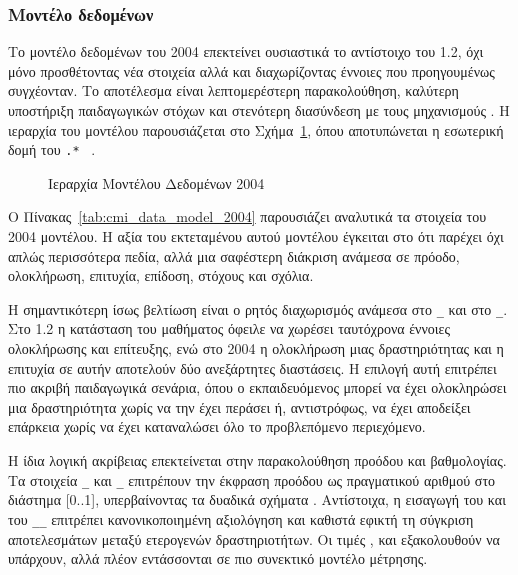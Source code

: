 \subsubsection{Μοντέλο δεδομένων}

Το μοντέλο δεδομένων του  2004 επεκτείνει ουσιαστικά το αντίστοιχο του  1.2, όχι μόνο προσθέτοντας νέα στοιχεία αλλά και διαχωρίζοντας έννοιες που προηγουμένως συγχέονταν. Το αποτέλεσμα είναι λεπτομερέστερη παρακολούθηση, καλύτερη υποστήριξη παιδαγωγικών στόχων και στενότερη διασύνδεση με τους μηχανισμούς . Η ιεραρχία του μοντέλου παρουσιάζεται στο Σχήμα~\ref{fig:data_model_hierarchy}, όπου αποτυπώνεται η εσωτερική δομή του \texttt{.*} ~\cite{ADL_SCORM2004_RTE, IEEE_LOM_Data_Model}.

\begin{figure}[htbp]
\centering

\caption{Ιεραρχία Μοντέλου Δεδομένων  2004}
\label{fig:data_model_hierarchy}
\end{figure}

Ο Πίνακας~\ref{tab:cmi_data_model_2004} παρουσιάζει αναλυτικά τα στοιχεία του  2004  μοντέλου. Η αξία του εκτεταμένου αυτού μοντέλου έγκειται στο ότι παρέχει όχι απλώς περισσότερα πεδία, αλλά μια σαφέστερη διάκριση ανάμεσα σε πρόοδο, ολοκλήρωση, επιτυχία, επίδοση, στόχους και σχόλια.



Η σημαντικότερη ίσως βελτίωση είναι ο ρητός διαχωρισμός ανάμεσα στο \texttt{\_} και στο \texttt{\_}. Στο  1.2 η κατάσταση του μαθήματος όφειλε να χωρέσει ταυτόχρονα έννοιες ολοκλήρωσης και επίτευξης, ενώ στο  2004 η ολοκλήρωση μιας δραστηριότητας και η επιτυχία σε αυτήν αποτελούν δύο ανεξάρτητες διαστάσεις. Η επιλογή αυτή επιτρέπει πιο ακριβή παιδαγωγικά σενάρια, όπου ο εκπαιδευόμενος μπορεί να έχει ολοκληρώσει μια δραστηριότητα χωρίς να την έχει περάσει ή, αντιστρόφως, να έχει αποδείξει επάρκεια χωρίς να έχει καταναλώσει όλο το προβλεπόμενο περιεχόμενο.

Η ίδια λογική ακρίβειας επεκτείνεται στην παρακολούθηση προόδου και βαθμολογίας. Τα στοιχεία \texttt{\_} και \texttt{\_} επιτρέπουν την έκφραση προόδου ως πραγματικού αριθμού στο διάστημα [0..1], υπερβαίνοντας τα δυαδικά σχήματα . Αντίστοιχα, η εισαγωγή του \texttt{} και του \texttt{\_\_} επιτρέπει κανονικοποιημένη αξιολόγηση και καθιστά εφικτή τη σύγκριση αποτελεσμάτων μεταξύ ετερογενών δραστηριοτήτων. Οι τιμές ,  και  εξακολουθούν να υπάρχουν, αλλά πλέον εντάσσονται σε πιο συνεκτικό μοντέλο μέτρησης.

